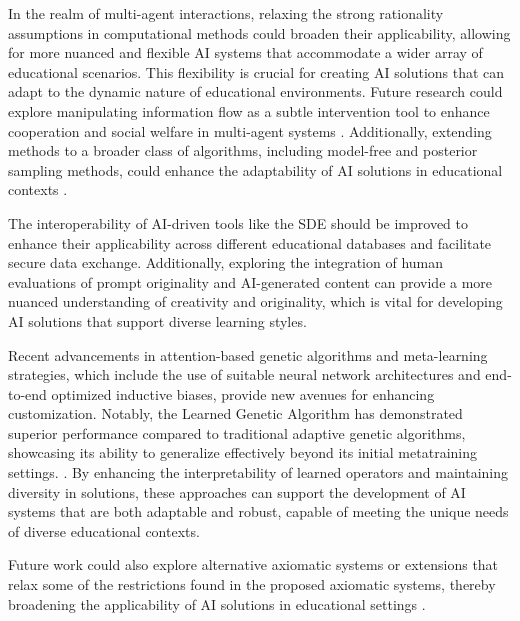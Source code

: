 In the realm of multi-agent interactions, relaxing the strong rationality assumptions in computational methods could broaden their applicability, allowing for more nuanced and flexible AI systems that accommodate a wider array of educational scenarios. This flexibility is crucial for creating AI solutions that can adapt to the dynamic nature of educational environments. Future research could explore manipulating information flow as a subtle intervention tool to enhance cooperation and social welfare in multi-agent systems \cite{chen2024adaptivenetworkinterventioncomplex}. Additionally, extending methods to a broader class of algorithms, including model-free and posterior sampling methods, could enhance the adaptability of AI solutions in educational contexts \cite{howson2023optimismdelaysepisodicreinforcement}.



The interoperability of AI-driven tools like the SDE should be improved to enhance their applicability across different educational databases and facilitate secure data exchange. Additionally, exploring the integration of human evaluations of prompt originality and AI-generated content can provide a more nuanced understanding of creativity and originality, which is vital for developing AI solutions that support diverse learning styles.



Recent advancements in attention-based genetic algorithms and meta-learning strategies, which include the use of suitable neural network architectures and end-to-end optimized inductive biases, provide new avenues for enhancing customization. Notably, the Learned Genetic Algorithm has demonstrated superior performance compared to traditional adaptive genetic algorithms, showcasing its ability to generalize effectively beyond its initial metatraining settings. \cite{lange2023discoveringattentionbasedgeneticalgorithms}. By enhancing the interpretability of learned operators and maintaining diversity in solutions, these approaches can support the development of AI systems that are both adaptable and robust, capable of meeting the unique needs of diverse educational contexts.



Future work could also explore alternative axiomatic systems or extensions that relax some of the restrictions found in the proposed axiomatic systems, thereby broadening the applicability of AI solutions in educational settings \cite{cieslinski2022axiomstypefreesubjectiveprobability}.



